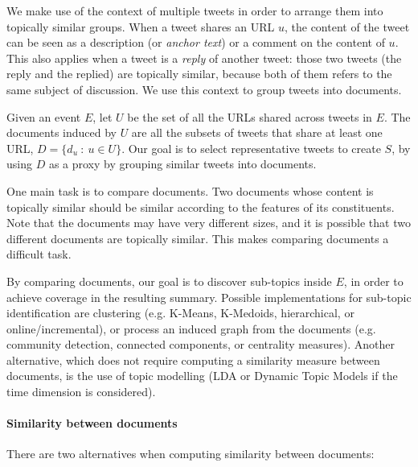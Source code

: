 \documentclass[12pt]{article}
\begin{document}
We make use of the context of multiple tweets in order to arrange them
into topically similar groups. When a tweet shares an URL $u$, the
content of the tweet can be seen as a description (or {\em anchor
text}) or a comment on the content of $u$. This also applies when a
tweet is a {\em reply} of another tweet: those two tweets (the reply
and the replied) are topically similar, because both of them refers to
the same subject of discussion. We use this context to group tweets
into documents.

Given an event $E$, let $U$ be the set of all the URLs shared across
tweets in $E$. The documents induced by $U$ are all the subsets of
tweets that share at least one URL, $D = \{d_u\ :\ u \in U\}$. Our
goal is to select representative tweets to create $S$, by using $D$ as
a proxy by grouping similar tweets into documents.

One main task is to compare documents. Two documents whose content is
topically similar should be similar according to the features of its
constituents. Note that the documents may have very different sizes,
and it is possible that two different documents are topically
similar. This makes comparing documents a difficult task.

By comparing documents, our goal is to discover sub-topics inside $E$,
in order to achieve coverage in the resulting summary. Possible
implementations for sub-topic identification are clustering
(e.g. K-Means, K-Medoids, hierarchical, or online/incremental), or
process an induced graph from the documents (e.g. community detection,
connected components, or centrality measures). Another alternative,
which does not require computing a similarity measure between
documents, is the use of topic modelling (LDA or Dynamic Topic Models
if the time dimension is considered).


\paragraph{Similarity between documents}

There are two alternatives when computing similarity between
documents:
\end{document}

